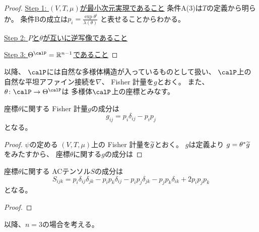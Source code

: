 \documentclass[report]{jlreq}
\begin{document}
\begin{proof}
    \uline{Step 1: $(V, T, \mu)$が最小次元実現であること} \quad
    条件A(3)は$T$の定義から明らか。
    条件Bの成立は$p_i = \frac{\exp\theta^i}{\lambda(\theta)}$
    と表せることからわかる。

    \uline{Step 2: $P$と$\theta$が互いに逆写像であること} \quad
    \TODO{}

    \uline{Step 3: $\Theta^\calP = \R^{n - 1}$であること} \quad
    \TODO{}
\end{proof}

以降、
$\calP$には自然な多様体構造が入っているものとして扱い、
$\calP$上の自然な平坦アファイン接続を$\nabla$、
Fisher 計量を$g$とおく。
また、$\theta \colon \calP \to \Theta^\calP$は
多様体$\calP$上の座標とみなす。

\begin{proposition}
    座標$\theta$に関する
    Fisher 計量$g$の成分は
    \begin{equation}
        g_{ij}
            = p_i \delta_{ij} - p_i p_j
    \end{equation}
    となる。
\end{proposition}

\begin{proof}
    $\psi$の定める
    $(V, T, \mu)$上の Fisher 計量を$\widetilde{g}$とおく。
    $g$は定義より
    $g = \theta^* \widetilde{g}$
    をみたすから、
    座標$\theta$に関する$g$の成分は
    \TODO{}
\end{proof}

\begin{proposition}[ACテンソルの成分]
    座標$\theta$に関する
    ACテンソル$S$の成分は
    \begin{equation}
        S_{ijk}
            = p_i \delta_{ij} \delta_{jk}
                - p_i p_k \delta_{ij}
                - p_i p_j \delta_{jk}
                - p_j p_k \delta_{ik}
                + 2 p_i p_j p_k
    \end{equation}
    となる。
\end{proposition}

\begin{proof}
    \TODO{}
\end{proof}

以降、$n = 3$の場合を考える。
\end{document}
